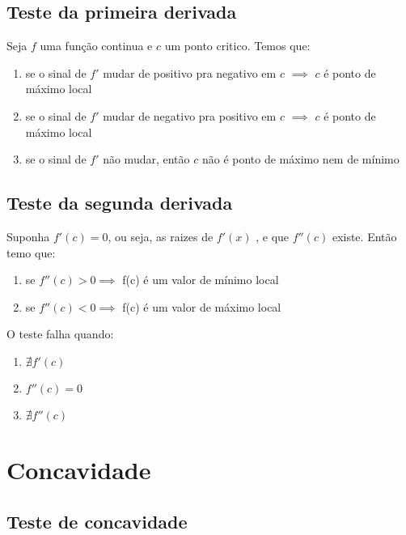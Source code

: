 \subsection{Teste da primeira derivada}
\begin{method}
    Seja \(f\) uma função continua e \(c\) um ponto critico. Temos que:
    \begin{enumerate}
        \item se o sinal de \(f'\) mudar de positivo pra negativo em \(c\) \(\implies\) \(c\) é ponto de máximo local
        \item se o sinal de \(f'\) mudar de negativo pra positivo em \(c\) \(\implies\) \(c\) é ponto de máximo local
        \item se o sinal de \(f'\) não mudar, então \(c\) não é ponto de máximo nem de mínimo
    \end{enumerate}    
\end{method}



\subsection{Teste da segunda derivada}

\begin{method}
    Suponha \(f'(c) = 0\), ou seja, as raizes de \(f'(x)\) , e que \(f''(c)\) existe. Então temo que:
    
    \begin{enumerate}
        \item se \(f''(c) > 0 \implies\) f(c) é um valor de mínimo local
        \item se \(f''(c) < 0 \implies\) f(c) é um valor de máximo local
    \end{enumerate}    
\end{method}
O teste falha quando:
\begin{enumerate}
    \item \(\nexists f'(c)\)
    \item \(f''(c) = 0\)
    \item \(\nexists f''(c)\)
\end{enumerate}

\section{Concavidade}

\subsection{Teste de concavidade}

